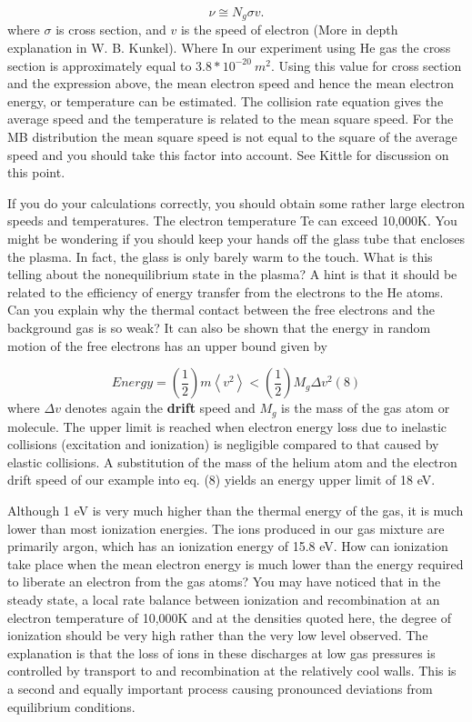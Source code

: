 \documentclass{../lab}
\begin{document}
\begin{equation}
    \nu \cong N_g \sigma v .
\end{equation}
where  \textbf{$\sigma$}  is cross section, and $v$ is the speed of electron (More in depth explanation in W. B. Kunkel). Where In our experiment using He gas the cross section is approximately equal to $3.8*10^{-20}\ m^2$. Using this value for cross section and the expression above, the mean electron speed and hence the mean electron energy, or temperature can be estimated. The collision rate equation gives the average speed and the temperature is related to the mean square speed. For the MB distribution the mean square speed is not equal to the square of the average speed and you should take this factor into account. See Kittle for discussion on this point.

If you do your calculations correctly, you should obtain some rather large electron speeds and temperatures. The electron temperature Te can exceed 10,000K. You might be wondering if you should keep your hands off the glass tube that encloses the plasma. In fact, the glass is only barely warm to the touch. What is this telling about the nonequilibrium state in the plasma? A hint is that it should be related to the efficiency of energy transfer from the electrons to the He atoms. Can you explain why the thermal contact between the free electrons and the background gas is so weak? It can also be shown that the energy in random motion of the free electrons has an upper bound given by

\begin{equation}
    Energy = \left ( \frac {1}{2} \right ) m \left \langle v^2 \right \rangle < \left ( \frac {1}{2} \right ) M_g \Delta v^2 (8)
\end{equation}
where $ \Delta v$ denotes again the \textbf{drift} speed and $M_g$ is the mass of the gas atom or molecule. The upper limit is reached when electron energy loss due to inelastic collisions (excitation and ionization) is negligible compared to that caused by elastic collisions. A substitution of the mass of the helium atom and the electron drift speed of our example into eq. (8) yields an energy upper limit of 18 eV.

Although 1 eV is very much higher than the thermal energy of the gas, it is much lower than most ionization energies. The ions produced in our gas mixture are primarily argon, which has an ionization energy of 15.8 eV. How can ionization take place when the mean electron energy is much lower than the energy required to liberate an electron from the gas atoms? You may have noticed that in the steady state, a local rate balance between ionization and recombination at an electron temperature of 10,000K and at the densities quoted here, the degree of ionization should be very high rather than the very low level observed. The explanation is that the loss of ions in these discharges at low gas pressures is controlled by transport to and recombination at the relatively cool walls. This is a second and equally important process causing pronounced deviations from equilibrium conditions.
\end{document}
